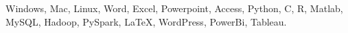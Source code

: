 	Windows, Mac, Linux, Word, Excel, Powerpoint, Access, 
	Python, C, R, Matlab, MySQL, Hadoop, PySpark, LaTeX, WordPress, 
	PowerBi, Tableau.